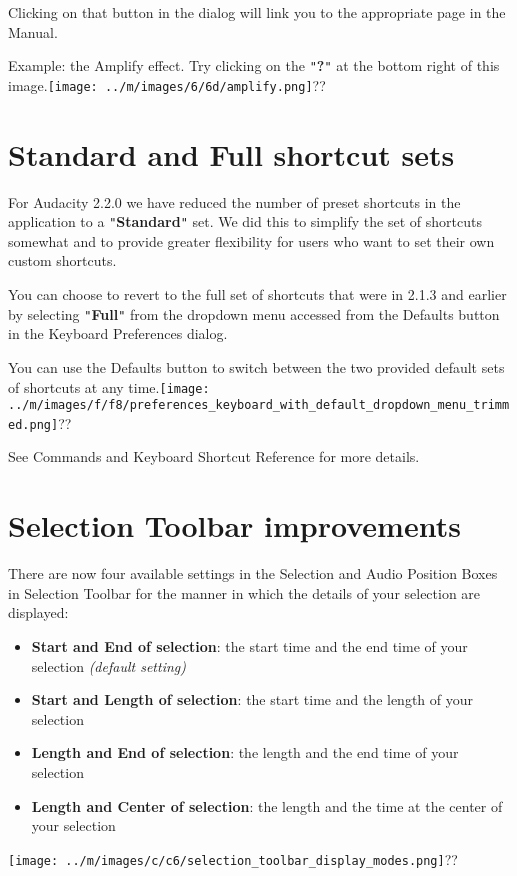 \documentclass[twocolumn]{book}
\begin{document}
Clicking on that button in the dialog will link you to the appropriate page in the Manual.

Example: the Amplify effect.  Try clicking on the \texttt{{}"{}}\textbf{?}\texttt{{}"{}} at the bottom right of this image.\texttt{[image: ../m/images/6/6d/amplify.png]}??



\section{Standard and Full shortcut sets}


For Audacity 2.2.0 we have reduced the number of preset shortcuts in the application to a \texttt{{}"{}}\textbf{Standard}\texttt{{}"{}} set.  We did this to simplify the set of shortcuts somewhat and to provide greater flexibility for users who want to set their own custom shortcuts.

You can choose to revert to the full set of shortcuts that were in 2.1.3 and earlier by selecting \texttt{{}"{}}\textbf{Full}\texttt{{}"{}} from the dropdown menu accessed from the Defaults button in the Keyboard Preferences dialog.

You can use the Defaults button to switch between the two provided default sets of shortcuts at any time.\texttt{[image: ../m/images/f/f8/preferences\_keyboard\_with\_default\_dropdown\_menu\_trimmed.png]}??

See Commands and Keyboard Shortcut Reference for more details.



\section{Selection Toolbar improvements}


There are now four available settings in the Selection and Audio Position Boxes in Selection Toolbar for the  manner in which the details of your selection are displayed:
\begin{itemize}
\item \textbf{Start and End of selection}: the start time and the end time of your selection \textit{(default setting)}
\item \textbf{Start and Length of selection}: the start time and the length of your selection
\item \textbf{Length and End of selection}: the length and the end time of your selection
\item \textbf{Length and Center of selection}: the length and the time at the center of your selection
\end{itemize}
\texttt{[image: ../m/images/c/c6/selection\_toolbar\_display\_modes.png]}??
\end{document}
